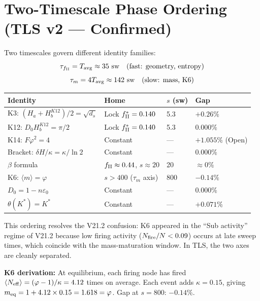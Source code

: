 \documentclass[12pt, a4paper]{article}
\begin{document}
\section{Two-Timescale Phase Ordering (TLS v2 --- Confirmed)}

\begin{derivedbox}[title={Phase Ordering: $N\to\infty$, No Ambiguity}]
Two timescales govern different identity families:
\[
  \tau_{f_{\rm II}} = T_{\rm avg} \approx 35\ \text{sw} \quad\text{(fast: geometry, entropy)}
\]
\[
  \tau_m = 4T_{\rm avg} \approx 142\ \text{sw} \quad\text{(slow: mass, K6)}
\]

\begin{center}
\renewcommand{\arraystretch}{1.3}
\begin{tabular}{p{4.5cm} p{3.5cm} p{1.5cm} p{2cm}}
\toprule
\textbf{Identity} & \textbf{Home} & \textbf{$s$ (sw)} & \textbf{Gap} \\
\midrule
K3: $(H_a+H_b^{K12})/2 = \sqrt{d_s}$ & Lock $f_{\rm II}^*=0.140$ & 5.3 & $+0.26\%$ \\
K12: $D_0 H_b^{K12} = \pi/2$ & Lock $f_{\rm II}^*=0.140$ & 5.3 & $0.000\%$ \\
K14: $F\varphi^2 = 4$ & Constant & --- & $+1.055\%$ (Open) \\
Bracket: $\delta H/\kappa = \kappa/\ln 2$ & Constant & --- & $0.000\%$ \\
$\beta$ formula & $f_{\rm II}\approx 0.44$, $s\approx 20$ & 20 & $\approx 0\%$ \\
K6: $\langle m\rangle = \varphi$ & $s>400$ ($\tau_m$ axis) & 800 & $-0.14\%$ \\
$D_0 = 1 - n\varepsilon_0$ & Constant & --- & $0.000\%$ \\
$\theta(K^*) = K^*$ & Constant & --- & $+0.071\%$ \\
\bottomrule
\end{tabular}
\end{center}

This ordering resolves the V21.2 confusion: K6 appeared in the ``Sub activity'' regime of V21.2 because low firing activity ($N_{\rm fire}/N < 0.09$) occurs at late sweep times, which coincide with the mass-maturation window. In TLS, the two axes are cleanly separated.

\textbf{K6 derivation:} At equilibrium, each firing node has fired $\langle N_{\rm eff}\rangle = (\varphi-1)/\kappa = 4.12$ times on average. Each event adds $\kappa = 0.15$, giving $m_{\rm eq} = 1 + 4.12\times 0.15 = 1.618 = \varphi$. Gap at $s=800$: $-0.14\%$.
\end{derivedbox}
\end{document}
